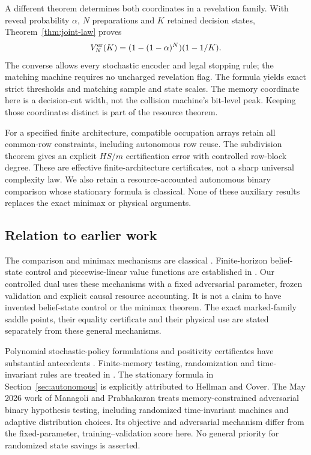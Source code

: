 \documentclass[11pt]{amsart}
\theoremstyle{definition}\newtheorem{definition}[theorem]{Definition}
\theoremstyle{remark}\newtheorem{remark}[theorem]{Remark}
\newcommand{\1}{\mathbf 1}
\begin{document}
A different theorem determines both coordinates in a revelation family.
With reveal probability $\alpha$, $N$ preparations and $K$ retained
decision states, Theorem~\ref{thm:joint-law} proves
\[
       V_N^{\rm er}(K)=(1-(1-\alpha)^N)(1-1/K).
\]
The converse allows every stochastic encoder and legal stopping rule;
the matching machine requires no uncharged revelation flag. The formula
yields exact strict thresholds and matching sample and state scales.
The memory coordinate here is a decision-cut width, not the collision
machine's bit-level peak. Keeping those coordinates distinct is part
of the resource theorem.

For a specified finite architecture, compatible occupation arrays retain
all common-row constraints, including autonomous row reuse. The
subdivision theorem gives an explicit $HS/m$ certification error with
controlled row-block degree. These are effective finite-architecture
certificates, not a sharp universal complexity law. We also retain a
resource-accounted autonomous binary comparison whose stationary formula
is classical. None of these auxiliary results replaces the exact
minimax or physical arguments.

\subsection{Relation to earlier work}
The comparison and minimax mechanisms are classical
\cite{Blackwell,Sion}. Finite-horizon belief-state control and
piecewise-linear value functions are established in
\cite{SmallwoodSondik}. Our controlled dual uses these mechanisms with a
fixed adversarial parameter, frozen validation and explicit causal
resource accounting. It is not a claim to have invented belief-state
control or the minimax theorem. The exact marked-family saddle points,
their equality certificate and their physical use are stated separately
from these general mechanisms.

Polynomial stochastic-policy formulations and positivity certificates
have substantial antecedents \cite{MM,Putinar}. Finite-memory testing,
randomization and time-invariant rules are treated in
\cite{HC,HCrandom,FH,CFH}. The stationary formula in
Section~\ref{sec:autonomous} is explicitly attributed to Hellman and
Cover. The May 2026 work of Managoli and Prabhakaran \cite{MP} treats
memory-constrained adversarial binary hypothesis testing, including
randomized time-invariant machines and adaptive distribution choices.
Its objective and adversarial mechanism differ from the fixed-parameter,
training--validation score here. No general priority for randomized
state savings is asserted.
\end{document}
